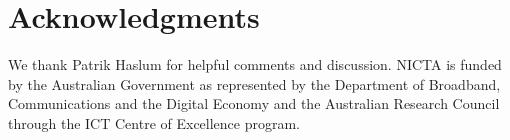 \section*{Acknowledgments}
\label{sec:ack}
We thank Patrik Haslum for helpful comments and discussion.
NICTA is funded by the Australian Government 
as represented by the Department 
of Broadband, Communications and the Digital Economy 
and the Australian Research Council 
through the ICT Centre of Excellence program.
